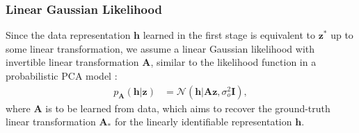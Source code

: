\documentclass[10pt]{article} %
\theoremstyle{plain}
\theoremstyle{definition}
\begin{document}
\subsubsection{Linear Gaussian Likelihood}
Since the data representation $\mathbf{h}$ learned in the first stage is equivalent to $\mathbf{z}^*$ up to some linear transformation, we assume a linear Gaussian likelihood with invertible linear transformation $\mathbf{A}$, similar to the likelihood function in a probabilistic PCA model \citep{tipping1999probabilistic}:
\begin{align}\label{eq:s2-lkl}
    p_{\mathbf{A}}(\mathbf{h}|\mathbf{z}) & =\mathcal{N}(\mathbf{h}|\mathbf{A}\mathbf{z},\sigma_{o}^{2}\mathbf{I}),
\end{align}
where $\mathbf{A}$ is to be learned from data, which aims to recover the ground-truth linear transformation $\mathbf{A}_*$ for the linearly identifiable representation $\mathbf{h}$.
\end{document}
